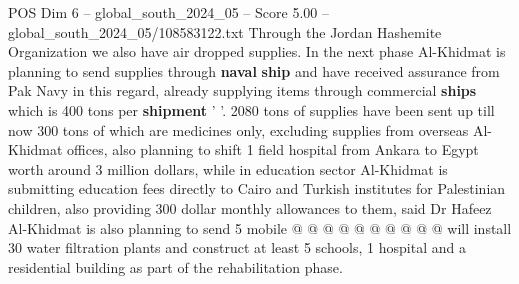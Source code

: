 \begin{textsample}{POS Dim 6 – global\_south\_2024\_05 – Score 5.00 – global\_south\_2024\_05/108583122.txt}
Through the Jordan Hashemite Organization we also have air dropped supplies.
In the next phase Al-Khidmat is planning to send supplies through \textbf{naval} \textbf{ship} and have received assurance from Pak Navy in this regard, already supplying items through commercial \textbf{ships} which is 400 tons per \textbf{shipment} ' '. 2080 tons of supplies have been sent up till now 300 tons of which are medicines only, excluding supplies from overseas Al-Khidmat offices, also planning to shift 1 field hospital from Ankara to Egypt worth around 3 million dollars, while in education sector Al-Khidmat is submitting education fees directly to Cairo and Turkish institutes for Palestinian children, also providing 300 dollar monthly allowances to them, said Dr Hafeez Al-Khidmat is also planning to send 5 mobile @ @ @ @ @ @ @ @ @ @ will install 30 water filtration plants and construct at least 5 schools, 1 hospital and a residential building as part of the rehabilitation phase.

\end{textsample}
